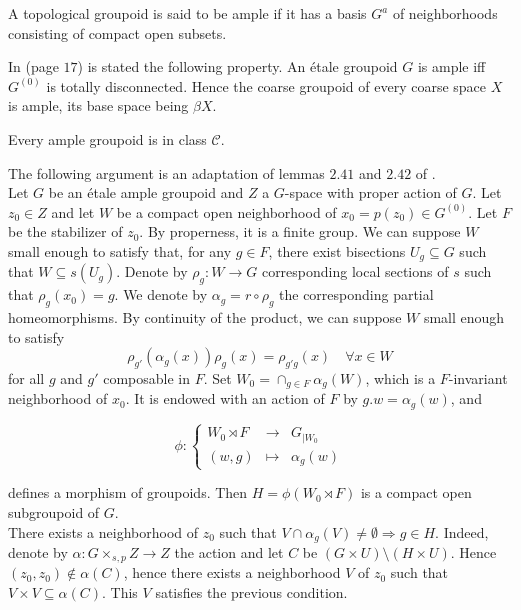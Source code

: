 \begin{definition}
A topological groupoid is said to be ample if it has a basis $G^a$ of neighborhoods consisting of compact open subsets.
\end{definition}

In \cite{paterson} (page $17$) is stated the following property. An étale groupoid $G$ is ample iff $G^{(0)}$ is totally disconnected. Hence the coarse groupoid of every coarse space $X$ is ample, its base space being $\beta X$.

\begin{prop}
Every ample groupoid is in class $\mathcal C$.
\end{prop}

\begin{dem} The following argument is an adaptation of lemmas $2.41$ and $2.42$ of \cite{TuNonHaus}.\\%

Let $G$ be an étale ample groupoid and $Z$ a $G$-space with proper action of $G$. Let $z_0\in Z$ and let $W$ be a compact open neighborhood of $x_0=p(z_0)\in G^{(0)}$. Let $F$ be the stabilizer of $z_0$. By properness, it is a finite group. We can suppose $W$ small enough to satisfy that, for any $g\in F$, there exist bisections $U_g \subseteq G$ such that $W \subseteq s(U_g)$. Denote by $\rho_g : W\rightarrow G$ corresponding local sections of $s$ such that $\rho_g(x_0)=g$. We denote by $\alpha_g =r\circ \rho_g$ the corresponding partial homeomorphisms. By continuity of the product, we can suppose $W$ small enough to satisfy 
\[\rho_{g'}(\alpha_g(x))\rho_g(x) = \rho_{g'g}(x) \quad\forall x\in W\]
for all $g$ and $g'$ composable in $F$. Set $W_0 = \cap_{g\in F}\alpha_g(W)$, which is a $F$-invariant neighborhood of $x_0$. It is endowed with an action of $F$ by $g.w=\alpha_g(w)$, and 

\[\phi : \left\{ \begin{array}{rcl}
W_0\rtimes F & \rightarrow & G_{|W_0} \\ 
(w,g) & \mapsto & \alpha_g(w) \end{array}\right.\] 

defines a morphism of groupoids. Then $H= \phi(W_0\rtimes F)$ is a compact open subgroupoid of $G$.\\

There exists a neighborhood of $z_0$ such that $V\cap \alpha_g(V) \neq \emptyset \Rightarrow g\in H$. Indeed, denote by $\alpha : G\times_{s,p} Z\rightarrow Z$ the action and let $C$ be  $(G\times U) \setminus (H\times U)$. Hence $(z_0,z_0)\notin \alpha(C)$, hence there exists a neighborhood $V$ of $z_0$ such that $V\times V \subseteq \alpha(C)$. This $V$ satisfies the previous condition. \\


\end{dem}
